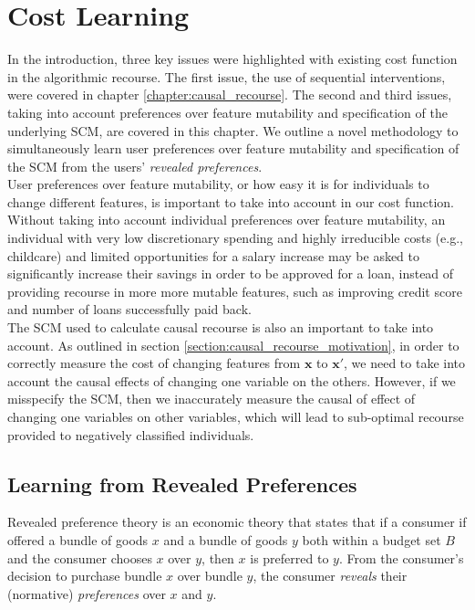 \chapter{Cost Learning} \label{chapter:cost_learning}

In the introduction, three key issues were highlighted with existing cost function in the algorithmic recourse. The first issue, the use of sequential interventions, were covered in chapter \ref{chapter:causal_recourse}. The second and third issues, taking into account preferences over feature mutability and specification of the underlying SCM, are covered in this chapter. We outline a novel methodology to simultaneously learn user preferences over feature mutability and specification of the SCM from the users' \textit{revealed preferences}. \\


User preferences over feature mutability, or how easy it is for individuals to change different features, is important to take into account in our cost function. Without taking into account individual preferences over feature mutability, an individual with very low discretionary spending and highly irreducible costs (e.g., childcare) and limited opportunities for a salary increase may be asked to significantly increase their savings in order to be approved for a loan, instead of providing recourse in more more mutable features, such as improving credit score and number of loans successfully paid back. \\

The SCM used to calculate causal recourse is also an important to take into account. As outlined in section \ref{section:causal_recourse_motivation}, in order to correctly measure the cost of changing features from $\mathbf{x}$ to $\mathbf{x}'$, we need to take into account the causal effects of changing one variable on the others. However, if we misspecify the SCM, then we inaccurately measure the causal of effect of changing one variables on other variables, which will lead to sub-optimal recourse provided to negatively classified individuals.

\section{Learning from Revealed Preferences}

Revealed preference theory \citep{samuelsonNotePureTheory1938, samuelsonConsumptionTheoryTerms1948} is an economic theory that states that if a consumer if offered a bundle of goods $x$ and a bundle of goods $y$ both within a budget set $B$ and the consumer chooses $x$ over $y$, then $x$ is preferred to $y$. From the consumer's decision to purchase bundle $x$ over bundle $y$, the consumer \textit{reveals} their (normative) \textit{preferences} over $x$ and $y$.

